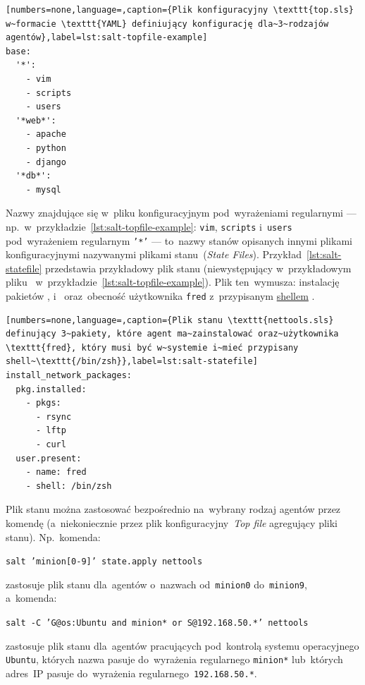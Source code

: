 \documentclass[thesis]{subfiles}
\begin{document}
\begin{lstlisting}[numbers=none,language=,caption={Plik konfiguracyjny \texttt{top.sls} w~formacie \texttt{YAML} definiujący konfigurację dla~3~rodzajów agentów},label=lst:salt-topfile-example]
base:
  '*':
    - vim
    - scripts
    - users
  '*web*':
    - apache
    - python
    - django
  '*db*':
    - mysql
\end{lstlisting}
Nazwy znajdujące się w~pliku konfiguracyjnym pod~wyrażeniami regularnymi --- np.~w~przykładzie~\ref{lst:salt-topfile-example}: \texttt{vim}, \texttt{scripts} i~\texttt{users} pod~wyrażeniem regularnym \texttt{'*'} --- to~nazwy stanów opisanych innymi plikami konfiguracyjnymi nazywanymi plikami stanu~(\emph{State Files}). Przykład~\ref{lst:salt-statefile} przedstawia przykładowy plik stanu  (niewystępujący w~przykładowym pliku~ w~przykładzie~\ref{lst:salt-topfile-example}). Plik ten~wymusza: instalację pakietów ,  i~ oraz~obecność użytkownika \texttt{fred} z~przypisanym \href{https://superuser.com/questions/144666/what-is-the-difference-between-shell-console-and-terminal}{shellem} \href{https://en.wikipedia.org/wiki/Z_shell}{}.

\begin{lstlisting}[numbers=none,language=,caption={Plik stanu \texttt{nettools.sls} definujący 3~pakiety, które agent ma~zainstalować oraz~użytkownika \texttt{fred}, który musi być w~systemie i~mieć przypisany shell~\texttt{/bin/zsh}},label=lst:salt-statefile]
install_network_packages:
  pkg.installed:
    - pkgs:
      - rsync
      - lftp
      - curl
  user.present:
    - name: fred
    - shell: /bin/zsh
\end{lstlisting}

Plik stanu można zastosować bezpośrednio na~wybrany rodzaj agentów przez komendę (a~niekoniecznie przez plik konfiguracyjny~\emph{Top file} agregujący pliki stanu). Np.~komenda:
\begin{center}
\texttt{salt 'minion[0-9]' state.apply nettools}
\end{center}
zastosuje plik stanu  dla~agentów o~nazwach od~\texttt{minion0} do~\texttt{minion9}, a~komenda:
\begin{center}
\texttt{salt -C 'G@os:Ubuntu and minion* or S@192.168.50.*' nettools}
\end{center}
zastosuje plik stanu  dla~agentów pracujących pod~kontrolą systemu operacyjnego \texttt{Ubuntu}, których nazwa pasuje do~wyrażenia regularnego \texttt{minion*} lub~których adres~IP pasuje do~wyrażenia regularnego~\texttt{192.168.50.*}.
\end{document}
